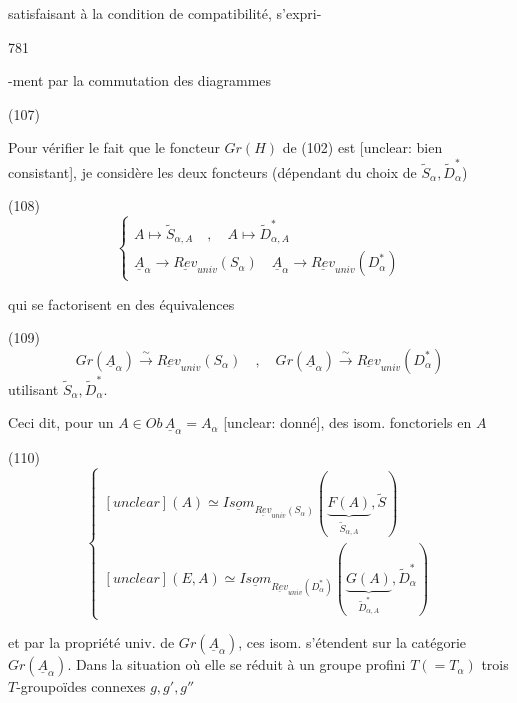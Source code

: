 satisfaisant à la condition de compatibilité, s'expri-

\newpage


781

-ment par la commutation des diagrammes

(107)

Pour vérifier le fait que le foncteur $Gr(H)$
de (102) est [unclear: bien consistant], je considère les
deux foncteurs (dépendant du choix de
$\tilde{S}_\alpha, \tilde{D}_\alpha^*$)

(108)
$$ \begin{cases} 
A \longmapsto \tilde{S}_{\alpha,A} \quad , \quad A \longmapsto \tilde{D}_{\alpha,A}^* \\ 
\underline{A}_\alpha \longrightarrow \underline{Rev}_{univ}(S_\alpha) \quad \underline{A}_\alpha \longrightarrow \underline{Rev}_{univ}(D_\alpha^*) 
\end{cases} $$

qui se factorisent en des équivalences

(109)
$$ Gr(\underline{A}_\alpha) \xrightarrow{\sim} \underline{Rev}_{univ}(S_\alpha) \quad , \quad Gr(\underline{A}_\alpha) \xrightarrow{\sim} \underline{Rev}_{univ}(D_\alpha^*) $$
utilisant $\tilde{S}_\alpha, \tilde{D}_\alpha^*$.

Ceci dit, pour un $A \in Ob \, \underline{A}_\alpha = A_\alpha$ [unclear: donné],
des isom. fonctoriels en $A$

(110)
$$ \begin{cases} 
[unclear](A) \simeq \underline{Isom}_{\underline{Rev}_{univ}(S_\alpha)}(\underbrace{F(A)}_{\tilde{S}_{\alpha,A}}, \tilde{S}) \\ 
[unclear](E,A) \simeq \underline{Isom}_{\underline{Rev}_{univ}(D_\alpha^*)}(\underbrace{G(A)}_{\tilde{D}_{\alpha,A}^*}, \tilde{D}_\alpha^*) 
\end{cases} $$

et par la propriété univ. de $Gr(\underline{A}_\alpha)$,
ces isom. s'étendent sur la
catégorie $Gr(\underline{A}_\alpha)$. Dans la situation où
elle se réduit à un groupe profini $T (= T_\alpha)$
trois $T$-groupoïdes connexes $g, g', g''$

\newpage

